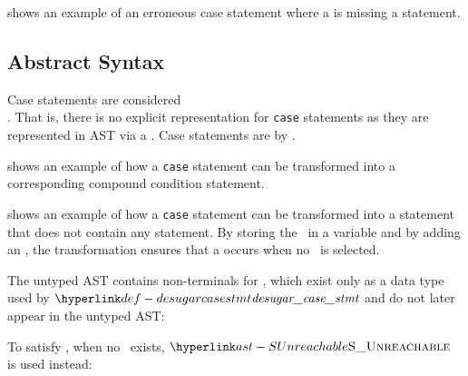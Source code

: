  shows an example of an erroneous case statement
where a \casealternativeterm{} is missing a statement.

\subsection{Abstract Syntax}

Case statements are considered \\ \syntacticsugar{}.
That is, there is no explicit representation for \texttt{case} statements
as they are represented in AST via a \conditionalstatementterm.
Case statements are \desugared{} by .

 shows an example of how a \texttt{case} statement can be transformed into a corresponding
compound condition statement.

 shows an example of how a \texttt{case} statement can be transformed into
a statement that does not contain any  statement.
By storing the \casediscriminantterm\ in a variable and by adding
an \unreachablestatementterm{}, the transformation ensures that a \dynamicerrorterm{} occurs when no
\casealternativeterm\ is selected.

The untyped AST contains non-terminals for \casealternativesterm, which exist
only as a data type used by $\desugarcasestmt$ and do not later appear in the untyped
AST:


To satisfy , when no \otherwisecaseterm\ exists,
$\SUnreachable$ is used instead:
\begin{mathpar}
\end{mathpar}

